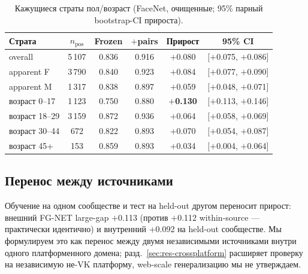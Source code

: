 \documentclass[journal]{IEEEtran}
\begin{document}
\begin{table}[!t]
\renewcommand{\arraystretch}{1.2}
\caption{Кажущиеся страты пол/возраст (FaceNet, очищенные; 95\% парный bootstrap-CI прироста).}
\label{tab:strata}
\centering
\footnotesize
\begin{tabular}{@{}lccccc@{}}
\toprule
Страта & $n_{\text{pos}}$ & Frozen & $+$pairs & Прирост & 95\% CI \\
\midrule
overall & 5\,107 & 0.836 & 0.916 & $+$0.080 & [$+$0.075, $+$0.086] \\
apparent F & 3\,790 & 0.840 & 0.923 & $+$0.084 & [$+$0.077, $+$0.090] \\
apparent M & 1\,317 & 0.838 & 0.897 & $+$0.059 & [$+$0.048, $+$0.071] \\
возраст 0--17 & 1\,123 & 0.750 & 0.880 & \textbf{$+$0.130} & [$+$0.113, $+$0.146] \\
возраст 18--29 & 3\,159 & 0.872 & 0.936 & $+$0.064 & [$+$0.058, $+$0.069] \\
возраст 30--44 & 672 & 0.822 & 0.893 & $+$0.070 & [$+$0.054, $+$0.087] \\
возраст 45+ & 153 & 0.859 & 0.893 & $+$0.034 & [$+$0.004, $+$0.064] \\
\bottomrule
\end{tabular}
\end{table}

\subsection{Перенос между источниками}\label{sec:res-cross}
Обучение на одном сообществе и тест на held-out другом переносит прирост: внешний FG-NET large-gap $+$0.113 (против $+$0.112 within-source --- практически идентично) и внутренний $+$0.092 на held-out сообществе. Мы формулируем это как перенос между двумя независимыми источниками внутри одного платформенного домена; разд.~\ref{sec:res-crossplatform} расширяет проверку на независимую не-VK платформу, web-scale генерализацию мы не утверждаем.
\end{document}
